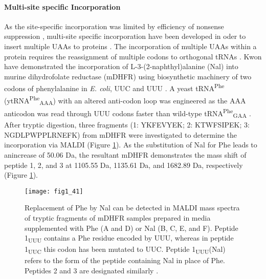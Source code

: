 \begin{refsection}
\paragraph{Multi-site specific Incorporation}
As the site-specific incorporation was limited by efficiency of nonsense
suppression \cite{Connor2007a}, multi-site specific incorporation have been
developed in oder to insert multiple UAAs to proteins
\cite{Takasu2011,Kwon2003}. The incorporation of multiple UAAs within a protein
requires the reassignment of multiple codons to orthogonal tRNAs
\cite{Connor2007a}.  Kwon  have demonstrated the incorporation of
L-3-(2-naphthyl)alanine (Nal) into murine dihydrofolate reductase (mDHFR) using
biosynthetic machinery of two codons of phenylalanine in \emph{E. coli}, UUC
and UUU \cite{Kwon2003}. A yeast tRNA\textsuperscript{Phe}
(ytRNA\textsuperscript{Phe}\textsubscript{AAA}) with an altered anti-codon
loop was engineered as the AAA anticodon was read through UUU codons faster than
wild-type tRNA\textsuperscript{Phe}\textsubscript{GAA} \cite{Kwon2003}. After
tryptic digestion, three fragments (1: YKFEVYEK; 2: KTWFSIPEK; 3:
NGDLPWPPLRNEFK) from mDHFR were investigated to determine the incorporation via
MALDI (Figure \ref{fig:msi}). As the substitution of Nal for Phe leads to
anincrease of 50.06 Da, the resultant mDHFR demonstrates the mass shift of
peptide 1, 2, and 3 at 1105.55 Da, 1135.61 Da, and 1682.89 Da, respectively
(Figure \ref{fig:msi}).
\begin{figure}[htbp] \centering \texttt{[image: fig1\_41]}
    \caption[Replacement of Phe by Nal can be detected in MALDI mass
    spectra of tryptic fragments of mDHFR samples prepared in media
    supplemented with Phe (A and D) or Nal (B, C, E, and F). Peptide
    1\textsubscript{UUU} contains a Phe residue encoded by UUU, whereas in
    peptide 1\textsubscript{UUC} this codon has been mutated to UUC. Peptide
    1\textsubscript{UUU}(Nal) refers to the form of the peptide containing Nal
    in place of Phe. Peptides 2 and 3 are designated similarly.] {Replacement
        of Phe by Nal can be detected in MALDI mass spectra of tryptic
        fragments of mDHFR samples prepared in media supplemented with Phe (A
        and D) or Nal (B, C, E, and F). Peptide 1\textsubscript{UUU} contains a
        Phe residue encoded by UUU, whereas in peptide 1\textsubscript{UUC}
        this codon has been mutated to UUC. Peptide 1\textsubscript{UUU}(Nal)
        refers to the form of the peptide containing Nal in place of Phe.
        Peptides 2 and 3 are designated similarly \cite{Kwon2003}.}
    \label{fig:msi}
\end{figure}


\end{refsection}

